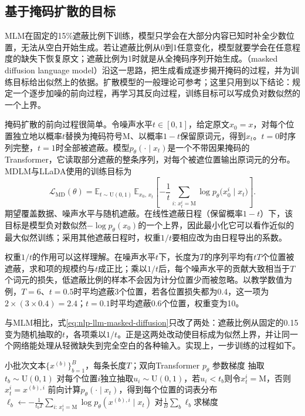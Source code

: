 \subsection{基于掩码扩散的目标}
\label{sec:nlp-llm-objective-diffusion}

MLM在固定的15\%遮蔽比例下训练，模型只学会在大部分内容已知时补全少数位置，无法从空白开始生成。若让遮蔽比例从0到1任意变化，模型就要学会在任意程度的缺失下恢复原文；遮蔽比例为1时就是从全掩码序列开始生成。（masked diffusion language model）沿这一思路，把生成看成逐步揭开掩码的过程，并为训练目标给出似然上的依据。扩散模型的一般理论可参考；这里只用到以下结论：规定一个逐步加噪的前向过程，再学习其反向过程，训练目标可以写成负对数似然的一个上界。

掩码扩散的前向过程很简单。令噪声水平$t\in[0,1]$，给定原文$x_0=x$，对每个位置独立地以概率$t$替换为掩码符号$\mathrm M$、以概率$1-t$保留原词元，得到$x_t$。$t=0$时序列完整，$t=1$时全部被遮蔽。模型$p_\theta(\cdot\mid x_t)$是一个不带因果掩码的Transformer，它读取部分遮蔽的整条序列，对每个被遮位置输出原词元的分布。MDLM与LLaDA使用的训练目标为
\begin{equation}
 \mathcal L_{\mathrm{MD}}(\theta)=
 \mathbb E_{t\sim\mathrm{U}(0,1)}\,\mathbb E_{x_0,\,x_t}
 \left[-\frac{1}{t}
 \sum_{i:\,x_t^i=\mathrm M}
 \log p_\theta\bigl(x_0^i\mid x_t\bigr)\right].
 \label{eq:nlp-llm-masked-diffusion}
\end{equation}
期望覆盖数据、噪声水平与随机遮蔽。在线性遮蔽日程（保留概率$1-t$）下，该目标是模型负对数似然$-\log p_\theta(x_0)$的一个上界，因此最小化它可以看作近似的最大似然训练；采用其他遮蔽日程时，权重$1/t$要相应改为由日程导出的系数。

权重$1/t$的作用可以这样理解。在噪声水平$t$下，长度为$T$的序列平均有$tT$个位置被遮蔽，求和项的规模约与$t$成正比；乘以$1/t$后，每个噪声水平的贡献大致相当于$T$个词元的损失，低遮蔽比例的样本不会因为计分位置少而被忽略。以教学数值为例，$T=6$、$t=0.5$时平均遮蔽3个位置，若各位置损失都为0.4，这一项为$2\times(3\times0.4)=2.4$；$t=0.1$时平均遮蔽0.6个位置，权重变为10。

与MLM相比，式\eqref{eq:nlp-llm-masked-diffusion}只改了两处：遮蔽比例从固定的0.15变为随机抽取的$t$，各项乘以$1/t$。正是这两处改动使目标成为似然上界，并让同一个网络能处理从轻微缺失到完全空白的各种输入。实现上，一步训练的过程如下。

\begin{algorithm}[掩码扩散语言模型的一步训练]
  \label{alg:nlp-llm-masked-diffusion}
  \begin{algorithmic}[1]
    \Require 小批次文本$\{x^{(b)}\}_{b=1}^{B}$，每条长度$T$；双向Transformer $p_\theta$
    \Ensure 参数梯度
      \State 抽取$t_b\sim\mathrm U(0,1)$
      \State 对每个位置$i$独立抽取$u_i\sim\mathrm U(0,1)$，若$u_i<t_b$则令$x_t^i=\mathrm M$，否则$x_t^i=x^{(b),i}$
      \State 前向计算$p_\theta(\cdot\mid x_t)$，得到每个位置的词表分布
      \State $\ell_b\gets-\frac{1}{t_bT}\sum_{i:\,x_t^i=\mathrm M}\log p_\theta(x^{(b),i}\mid x_t)$
    \EndFor
    \State 对$\frac1B\sum_b\ell_b$求梯度
  \end{algorithmic}
\end{algorithm}

